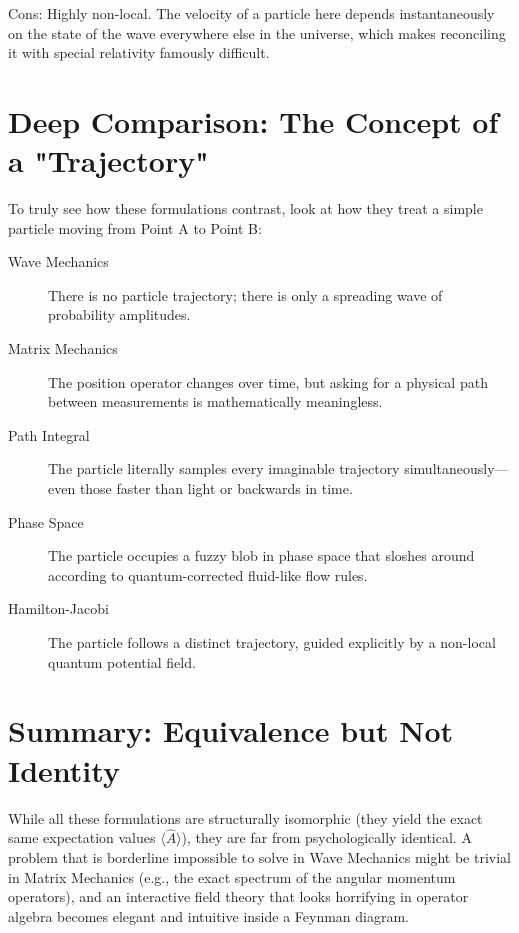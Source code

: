 Cons: Highly non-local. The velocity of a particle here depends instantaneously
on the state of the wave everywhere else in the universe, which makes 
reconciling it with special relativity famously difficult.
\section{Deep Comparison: The Concept of a "Trajectory"}

To truly see how these formulations contrast, look at how they treat a simple
particle moving from Point A to Point B:
\begin{description}
    \item [Wave Mechanics] There is no particle trajectory; 
        there is only a spreading wave of probability amplitudes.
    \item [Matrix Mechanics] The position operator changes over time, 
        but asking for a physical path between measurements is 
        mathematically meaningless.
    \item [Path Integral] The particle literally samples every imaginable
        trajectory simultaneously—even those faster than light or backwards in time.
    \item [Phase Space] The particle occupies a fuzzy blob in phase space 
        that sloshes around according to quantum-corrected fluid-like flow rules.
    \item [Hamilton-Jacobi] The particle follows a distinct trajectory,
        guided explicitly by a non-local quantum potential field.
\end{description}

\section{ Summary: Equivalence but Not Identity}

While all these formulations are structurally isomorphic (they yield the 
exact same expectation values $\langle \hat{A} \rangle$), 
they are far from psychologically identical. A problem that is borderline 
impossible to solve in Wave Mechanics might be trivial in Matrix Mechanics 
(e.g., the exact spectrum of the angular momentum operators), and an 
interactive field theory that looks horrifying in operator algebra becomes 
elegant and intuitive inside a Feynman diagram.


